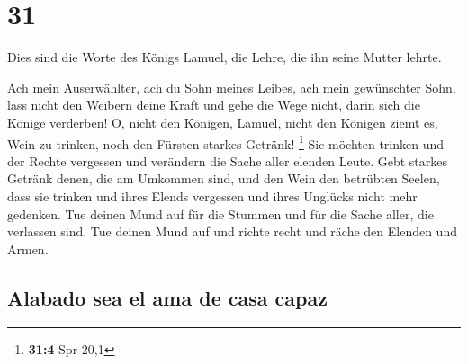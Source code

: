 \hypertarget{section-30}{%
\section{31}\label{section-30}}

 Dies sind die Worte des Königs Lamuel, die Lehre, die ihn
seine Mutter lehrte.

 Ach mein Auserwählter, ach du Sohn meines Leibes, ach
mein gewünschter Sohn,  lass nicht den Weibern deine Kraft
und gehe die Wege nicht, darin sich die Könige verderben! 
O, nicht den Königen, Lamuel, nicht den Königen ziemt es, Wein zu
trinken, noch den Fürsten starkes Getränk! \footnote{\textbf{31:4} Spr
  20,1}  Sie möchten trinken und der Rechte vergessen und
verändern die Sache aller elenden Leute.  Gebt starkes
Getränk denen, die am Umkommen sind, und den Wein den betrübten Seelen,
 dass sie trinken und ihres Elends vergessen und ihres
Unglücks nicht mehr gedenken.  Tue deinen Mund auf für die
Stummen und für die Sache aller, die verlassen sind.  Tue
deinen Mund auf und richte recht und räche den Elenden und Armen.

\hypertarget{alabado-sea-el-ama-de-casa-capaz}{%
\subsection{Alabado sea el ama de casa
capaz}\label{alabado-sea-el-ama-de-casa-capaz}}

